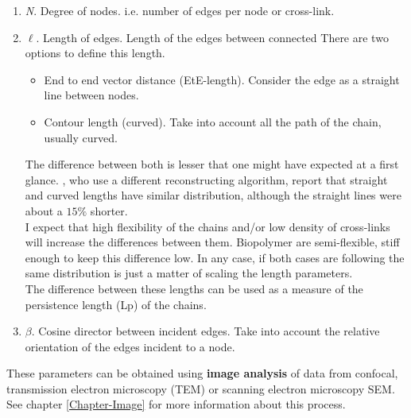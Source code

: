 \begin{enumerate} 
\item \emph{N}. Degree of nodes. i.e. number of edges per node or cross-link. 
\item \emph{$\ell$}. Length of edges. Length of the edges between connected
There are two options to define this length.
\begin{itemize}
\item End to end vector distance (EtE-length). Consider the edge as a straight
line between nodes.

\item Contour length (curved). Take into account all the path of the chain,
usually curved.
\end{itemize}

The difference between both is lesser that one
might have expected at a first glance. \citet{nisslert_identification_2007},
who use a different reconstructing algorithm, report that straight and curved
lengths have similar distribution, although the straight lines were about a
$15\%$ shorter.\\
I expect that high flexibility of the chains and/or low density of cross-links
will increase the differences between them. Biopolymer are semi-flexible, stiff
enough to keep this difference low.
In any case, if both cases are following the same distribution is just a matter
of scaling the length parameters.\\
The difference between these lengths can be used as a measure of the
persistence length (\gls{Lp}) of the chains.
  

\item \emph{$\beta$}. Cosine director between incident edges. Take into account
the relative orientation of the edges incident to a node.


\end{enumerate}

These parameters can be obtained using \textbf{image analysis} of data from
\gls{confocal}, transmission electron microscopy (\gls{TEM}) or
scanning electron microscopy \gls{SEM}. See chapter \ref{Chapter-Image} for
more information about this process.

